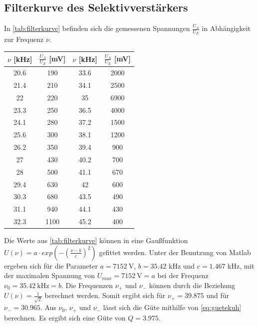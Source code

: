 \subsection{Filterkurve des Selektivverstärkers}
In \autoref{tab:filterkurve} befinden sich die gemessenen Spannungen $\frac{U_{A}}{U_{E}}$ in Abhängigkeit zur Frequenz $\nu$.
\begin{table}[H]
 \centering 
 \begin{tabular}{cccc} \toprule
 $\nu$ [kHz]& $\frac{U_{A}}{U_{E}}$ [mV] & $\nu$ [kHz]& $\frac{U_{A}}{U_{E}}$ [mV]\\  \midrule
 20.6 & 190 & 33.6 & 2000\\ 
 21.4 & 210 & 34.1 & 2500\\ 
 22   & 220 & 35   & 6900\\
 23.3 & 250 & 36.5 & 4000\\
 24.1 & 280 & 37.2 & 1500\\
 25.6 & 300 & 38.1 & 1200\\
 26.2 & 350 & 39.4 & 900\\
 27   & 430 & 40.2 & 700\\
 28   & 500 & 41.1 & 670\\
 29.4 & 630 & 42   & 600\\
 30.3 & 680 & 43.5 & 490\\
 31.1 & 940 & 44.1 & 430\\
 32.3 & 1100 & 45.2 & 400\\ \bottomrule
 \end{tabular} 
 \label{tab:filterkurve}
\end{table} 
Die Werte aus \autoref{tab:filterkurve} können in eine Gaußfunktion $U(\nu)=a\cdot exp(-(\frac{\nu-b}{c})^2)$ gefittet werden. 
Unter der Benutzung von Matlab ergeben sich für die Parameter $a=7152\ \si{\V}$, $b=35.42$ kHz und $c=1.467$ kHz, 
mit der maximalen Spannung von $U_{max}=7152\ \si{\V}=a$ bei der Frequenz $\nu_{0}=35.42\ \si{\kHz}=b$. 
Die Frequenzen $\nu_{+}$ und $\nu_{-}$ können durch die Beziehung $U(\nu)=\frac{1}{\sqrt{2}}$ berechnet werden. 
Somit ergibt sich für $\nu_{+}=39.875$ und für $\nu_{-}=30.965$. 
Aus $\nu_{0}$, $\nu_{+}$ und $\nu_{-}$ lässt sich die Güte mithilfe von \autoref{eq:guetekuh}
berechnen. Es ergibt sich eine Güte von $Q=3.975$.
